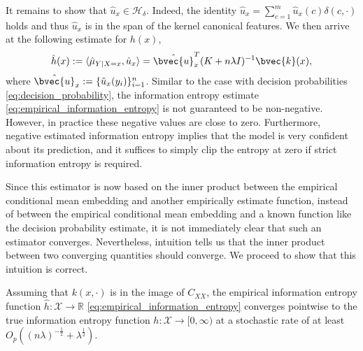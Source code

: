 \documentclass[runningheads, envcountsame, a4paper]{llncs}
\begin{document}
		It remains to show that $\hat{u}_{x} \in \mathcal{H}_{\delta}$. Indeed, the identity $\hat{u}_{x} = \sum_{c = 1}^{m} \hat{u}_{x}(c) \delta(c, \cdot)$ holds and thus $\hat{u}_{x}$ is in the span of the kernel canonical features. We then arrive at the following estimate for $h(x)$,
		\begin{equation}
			\hat{h}(x) := \langle \hat{\mu}_{Y | X = x}, \hat{u}_{x} \rangle = \hat{\bvec{u}}_{x}^{T} (K + n \lambda I)^{-1} \bvec{k}(x),
		\label{eq:empirical_information_entropy}
		\end{equation}
		where $\hat{\bvec{u}}_{x} := \{\hat{u}_{x}(y_{i})\}_{i = 1}^{n}$. Similar to the case with decision probabilities \eqref{eq:decision_probability}, the information entropy estimate \eqref{eq:empirical_information_entropy} is not guaranteed to be non-negative. However, in practice these negative values are close to zero. Furthermore, negative estimated information entropy implies that the model is very confident about its prediction, and it suffices to simply clip the entropy at zero if strict information entropy is required. 
		
		Since this estimator is now based on the inner product between the empirical conditional mean embedding and another empirically estimate function, instead of between the empirical conditional mean embedding and a known function like the decision probability estimate, it is not immediately clear that such an estimator converges. Nevertheless, intuition tells us that the inner product between two converging quantities should converge. We proceed to show that this intuition is correct.
		
		\begin{theorem}
			\label{thm:entropy_convergence}
			Assuming that $k(x, \cdot)$ is in the image of $C_{XX}$, the empirical information entropy function $\hat{h} : \mathcal{X} \to \mathbb{R}$ \eqref{eq:empirical_information_entropy} converges pointwise to the true information entropy function $h : \mathcal{X} \to [0, \infty)$ at a stochastic rate of at least $O_{p}((n \lambda)^{-\frac{1}{2}} + \lambda^{\frac{1}{2}})$.
		\end{theorem}
		
\end{document}
